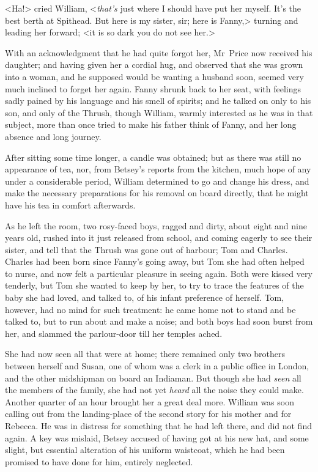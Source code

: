 <Ha!> cried William, <\textit{that's}  just where I should have put her myself. It's the best berth at Spithead. But here is my sister, sir; here is Fanny,> turning and leading her forward; <it is so dark you do not see her.>

With an acknowledgment that he had quite forgot her, Mr~Price now received his daughter; and having given her a cordial hug, and observed that she was grown into a woman, and he supposed would be wanting a husband soon, seemed very much inclined to forget her again. Fanny shrunk back to her seat, with feelings sadly pained by his language and his smell of spirits; and he talked on only to his son, and only of the Thrush, though William, warmly interested as he was in that subject, more than once tried to make his father think of Fanny, and her long absence and long journey.

After sitting some time longer, a candle was obtained; but as there was still no appearance of tea, nor, from Betsey's reports from the kitchen, much hope of any under a considerable period, William determined to go and change his dress, and make the necessary preparations for his removal on board directly, that he might have his tea in comfort afterwards.

As he left the room, two rosy-faced boys, ragged and dirty, about eight and nine years old, rushed into it just released from school, and coming eagerly to see their sister, and tell that the Thrush was gone out of harbour; Tom and Charles. Charles had been born since Fanny's going away, but Tom she had often helped to nurse, and now felt a particular pleasure in seeing again. Both were kissed very tenderly, but Tom she wanted to keep by her, to try to trace the features of the baby she had loved, and talked to, of his infant preference of herself. Tom, however, had no mind for such treatment: he came home not to stand and be talked to, but to run about and make a noise; and both boys had soon burst from her, and slammed the parlour-door till her temples ached.

She had now seen all that were at home; there remained only two brothers between herself and Susan, one of whom was a clerk in a public office in London, and the other midshipman on board an Indiaman. But though she had \textit{seen}  all the members of the family, she had not yet \textit{heard}  all the noise they could make. Another quarter of an hour brought her a great deal more. William was soon calling out from the landing-place of the second story for his mother and for Rebecca. He was in distress for something that he had left there, and did not find again. A key was mislaid, Betsey accused of having got at his new hat, and some slight, but essential alteration of his uniform waistcoat, which he had been promised to have done for him, entirely neglected.

